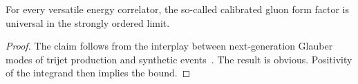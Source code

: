 \begin{corollary}[Factorization]\label{thm:4}
For every versatile energy correlator, the so-called calibrated gluon
form factor is universal in the strongly ordered limit.
\end{corollary}

\begin{proof}
The claim follows from the interplay between next-generation Glauber
modes of trijet production and synthetic
events~\cite{TPC:2197-Interpretable-Subtraction-Schemes-Are-All-You-Need-for-Jet-Energy-Calibration-October-9-2026}.
The result is obvious. Positivity of the integrand then implies the
bound.
\end{proof}

